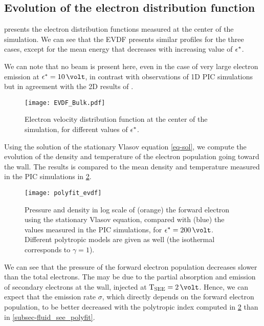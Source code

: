 \subsection{Evolution of the electron distribution function} \label{subsec-EVDF_see_polyfit}

 presents the electron distribution functions measured at the center of the simulation. 
We can see that the \ac{EVDF} presents similar profiles for the three cases, except for the mean energy that decreases with increasing value of $\epsilon^{*}$.

We can note that no beam is present here, even in the case of very large electron emission at $\crover=10\,\volt$, in contrast with observations of \ac{1D} PIC simulations \citep{sydorenko2006b,sydorenko2007} but in agreement with the \ac{2D} results of \citet{heron2013}.



\begin{figure}[hbtp]
  \centering
  \texttt{[image: EVDF\_Bulk.pdf]}
  \caption{Electron velocity distribution function at the center of the simulation, for different values of $\epsilon^{*}$.}
  \label{fig-evdf_epsstar}
\end{figure}

Using the solution of the stationary Vlasov equation \cref{eq-sol}, we compute the evolution of the density and temperature of the electron population going toward the wall.
The results is compared to the mean density and temperature measured in the \ac{PIC} simulations in \cref{fig-evdf_polyfit}.

\begin{figure}[hbtp]
  \centering
  \texttt{[image: polyfit\_evdf]}
  \caption{Pressure and density in log scale of (orange) the forward electron using the stationary Vlasov equation, compared with (blue) the values measured in the \ac{PIC} simulations, for $\crover=200\,\volt$. Different polytropic models are given as well (the isothermal corresponds to $\gamma=1$).}
  \label{fig-evdf_polyfit}
\end{figure}

We can see that the pressure of the forward electron population decreases slower than the total electrons.
The may be due to the partial absorption and emission of secondary electrons at the wall, injected at $\Tsee=2\,\volt$.
Hence, we can expect that the emission rate $\sigma$, which directly depends on the forward electron population, to be better decreased with the polytropic index computed in \cref{fig-evdf_polyfit} than in \cref{subsec-fluid_see_polyfit}.

